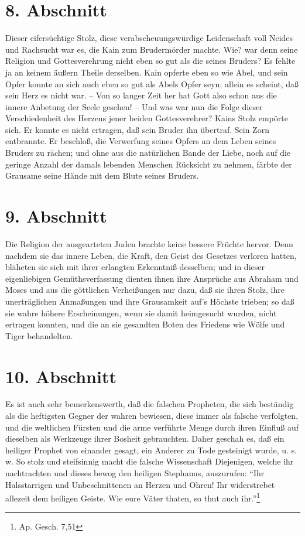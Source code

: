 \section{8. Abschnitt}

Dieser eifersüchtige Stolz, diese verabscheuungswürdige Leidenschaft voll Neides
und Rachsucht war es, die Kain zum Brudermörder machte. Wie? war denn seine
Religion und Gottesverehrung nicht eben so gut als die seines Bruders? Es fehlte
ja an keinem äußern Theile derselben. Kain opferte eben so wie Abel, und sein
Opfer konnte an sich auch eben so gut als  Abels Opfer seyn; allein es scheint,
daß sein Herz es nicht war. -- Von so langer Zeit her hat Gott also schon aus
die innere Anbetung der Seele gesehen! -- Und was war nun die Folge dieser
Verschiedenheit des Herzens jener beiden Gottesverehrer? Kains Stolz empörte
sich. Er konnte es nicht ertragen, daß sein Bruder ihn übertraf. Sein Zorn
entbrannte. Er beschloß, die Verwerfung seines Opfers an dem Leben seines
Bruders zu rächen; und ohne aus die natürlichen Bande der Liebe, noch auf die
geringe Anzahl der damals lebenden Menschen Rücksicht zu nehmen, färbte der
Grausame seine Hände mit dem Blute seines Bruders.

\section{9. Abschnitt}

Die Religion der ausgearteten Juden brachte keine bessere Früchte hervor. Denn
nachdem sie das innere Leben, die Kraft, den Geist des Gesetzes verloren hatten,
bläheten sie sich mit ihrer erlangten Erkenntniß desselben; und in dieser
eigenliebigen Gemüthsverfassung dienten ihnen ihre Ansprüche aus Abraham und
Moses und aus die göttlichen Verheißungen nur dazu, daß sie ihren Stolz, ihre
unerträglichen Anmaßungen und ihre Grausamkeit auf's Höchste trieben; so daß sie
wahre höhere Erscheinungen, wenn sie damit heimgesucht wurden, nicht ertragen
konnten, und die an sie gesandten Boten des Friedens wie Wölfe und Tiger
behandelten.

\section{10. Abschnitt}

Es ist auch sehr bemerkenswerth, daß die falschen Propheten, die sich beständig
als die heftigsten Gegner der wahren bewiesen, diese immer als falsche
verfolgten, und die weltlichen Fürsten und die arme verführte Menge durch ihren
Einfluß auf dieselben als Werkzeuge ihrer Bosheit gebrauchten. Daher geschah es,
daß ein heiliger Prophet von einander gesagt, ein Anderer zu Tode gesteinigt
wurde, u. s. w. So stolz und steifsinnig macht die falsche Wissenschaft
Diejenigen, welche ihr nachtrachten und dieses bewog den heiligen Stephanus,
auszurufen: "`Ihr Halsstarrigen und Unbeschnittenen an Herzen und Ohren! Ihr
widerstrebet allezeit dem heiligen Geiste. Wie eure Väter thaten, so thut auch
ihr."'\footnote{Ap. Gesch. 7,51}


